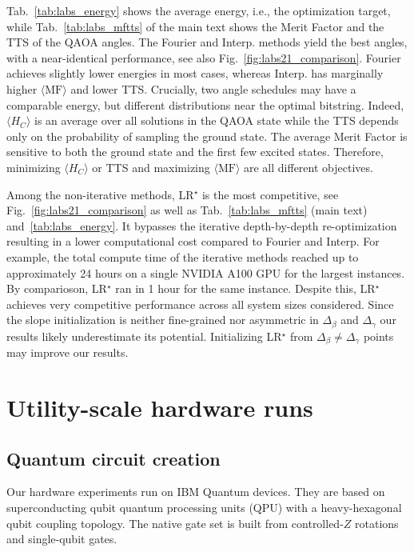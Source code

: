 \documentclass[twocolumn,
english,
aps,
pra,
10pt,
longbibliography,
superscriptaddress,
amsmath,
amssymb,
floatfix
]{revtex4-2}
\begin{document}
{Tab.~\ref{tab:labs_energy} shows the average energy, i.e., the optimization target, while Tab.~\ref{tab:labs_mftts} of the main text shows the Merit Factor and the TTS of the QAOA angles.  
The Fourier and Interp. methods yield the best angles, with a near-identical performance, see also Fig.~\ref{fig:labs21_comparison}.
Fourier achieves slightly lower energies in most cases, whereas Interp. has marginally higher $\langle \textrm{MF}\rangle$ and lower TTS. 
Crucially, two angle schedules may have a comparable energy, but different distributions near the optimal bitstring.
Indeed, $\langle H_C \rangle$ is an average over all solutions in the QAOA state while the TTS depends only on the probability of sampling the ground state. 
The average Merit Factor is sensitive to both the ground state and the first few excited states.
Therefore, minimizing $\langle H_C \rangle$ or TTS and maximizing $\langle \textrm{MF}\rangle$ are all different objectives. 

Among the non-iterative methods, LR$^\star$ is the most competitive, see Fig.~\ref{fig:labs21_comparison} as well as Tab.~\ref{tab:labs_mftts} (main text) and~\ref{tab:labs_energy}.
It bypasses the iterative depth-by-depth re-optimization resulting in a lower computational cost compared to Fourier and Interp. 
For example, the total compute time of the iterative methods reached up to approximately 24 hours on a single NVIDIA A100 GPU for the largest instances.
By comparioson, LR$^\star$ ran in 1 hour for the same instance.
Despite this, LR$^\star$ achieves very competitive performance across all system sizes considered. 
Since the slope initialization is neither fine-grained nor asymmetric in $\Delta_\beta$ and $\Delta_\gamma$ our results likely underestimate its potential.
Initializing LR$^\star$ from $\Delta_\beta\neq\Delta_\gamma$ points may improve our results.  

\section{Utility-scale hardware runs\label{app:example_hw}}

\subsection{Quantum circuit creation\label{app:circuit_creation}}

Our hardware experiments run on IBM Quantum devices.
They are based on superconducting qubit quantum processing units (QPU) with a heavy-hexagonal qubit coupling topology.
The native gate set is built from controlled-$Z$ rotations and single-qubit gates.

}
\end{document}
